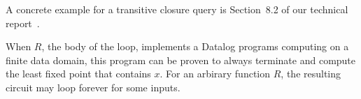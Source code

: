 A concrete example for a transitive closure query is Section~8.2 of
our technical report~\cite{tr}.

%
%

When $R$, the body of the loop, implements a Datalog programs
computing on a finite data domain, this program can be proven to
always terminate and compute the least fixed point that contains $x$.
For an arbirary function $R$, the resulting circuit may loop forever
for some inputs.

